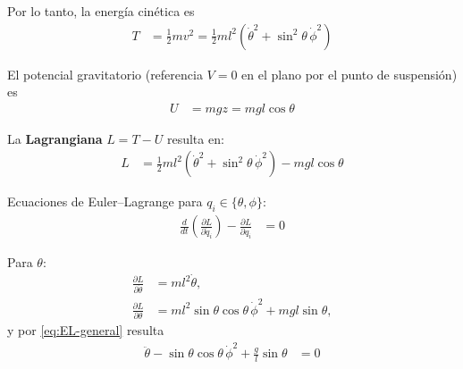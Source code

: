\documentclass{article}
\begin{document}
Por lo tanto, la energía cinética es
\begin{equation}
\begin{split}
T
&= \frac{1}{2} m v^{2}
  = \frac{1}{2} m l^{2}\!
      \left(\dot{\theta}^{2}
            + \sin^{2}\theta\,\dot{\phi}^{2}\right)
\end{split}\label{eq:T}
\end{equation}

El potencial gravitatorio (referencia $V=0$ en el plano por el punto de suspensión) es
\begin{equation}
\begin{split}
U &= m g z = m g l \cos\theta 
\end{split}\label{eq:U}
\end{equation}

La \textbf{Lagrangiana} $L=T-U$ resulta en:
\begin{equation}
\begin{split}
L
&= \frac{1}{2} m l^2 \left(\dot\theta^2 + \sin^2\theta\,\dot\phi^2 \right)
   - m g l \cos\theta 
\end{split}\label{eq:L}
\end{equation}

Ecuaciones de Euler–Lagrange para $q_i\in\{\theta,\phi\}$:
\begin{equation}
\begin{split}
\frac{d}{dt}\!\left(\frac{\partial L}{\partial \dot q_i}\right)
-\frac{\partial L}{\partial q_i} &= 0 
\end{split}\label{eq:EL-general}
\end{equation}

Para $\theta$:
\begin{equation}
\begin{split}
\frac{\partial L}{\partial \dot\theta} &= m l^{2}\dot{\theta},\\
\frac{\partial L}{\partial \theta}
&= m l^{2}\sin\theta\cos\theta\,\dot\phi^{2}
 + m g l \sin\theta,
\end{split}\label{eq:parciales-theta}
\end{equation}
y por \eqref{eq:EL-general} resulta
\begin{equation}
\begin{split}
\ddot\theta
 - \sin\theta\cos\theta\,\dot\phi^{2}
 + \frac{g}{l}\sin\theta &= 0 
\end{split}\label{eq:ecuacion-theta}
\end{equation}
\end{document}
